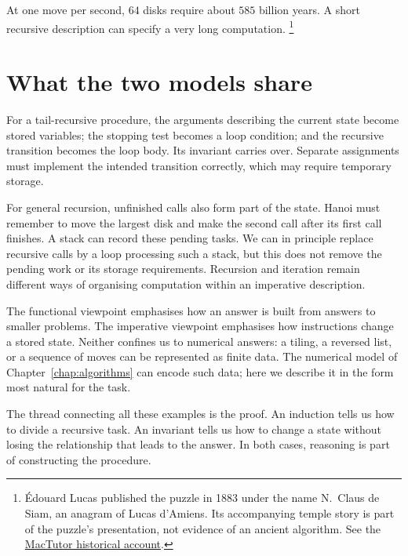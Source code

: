 At one move per second, $64$ disks require about $585$ billion years.
A short recursive description can specify a very long computation.
\footnote{\'Edouard Lucas published the puzzle in 1883 under the name
N.~Claus de Siam, an anagram of Lucas d'Amiens. Its accompanying temple
story is part of the puzzle's presentation, not evidence of an ancient
algorithm. See the \href{https://mathshistory.st-andrews.ac.uk/Extras/Hanoi/}{MacTutor historical account}.}

\section{What the two models share}

For a tail-recursive procedure, the arguments describing the current state
become stored variables; the stopping test becomes a loop condition;
and the recursive transition becomes the loop body. Its invariant carries
over. Separate assignments must implement the intended transition correctly,
which may require temporary storage.

For general recursion, unfinished calls also form part of the state. Hanoi
must remember to move the largest disk and make the second call after its
first call finishes. A stack can record these pending tasks. We can in
principle replace recursive calls by a loop processing such a stack, but
this does not remove the pending work or its storage requirements.
Recursion and iteration remain different ways of organising computation
within an imperative description.

The functional viewpoint emphasises how an answer is built from answers
to smaller problems. The imperative viewpoint emphasises how instructions
change a stored state. Neither confines us to numerical answers: a tiling,
a reversed list, or a sequence of moves can be represented as finite data.
The numerical model of Chapter~\ref{chap:algorithms} can encode such data; here
we describe it in the form most natural for the task.

The thread connecting all these examples is the proof. An induction tells
us how to divide a recursive task. An invariant tells us how to change a
state without losing the relationship that leads to the answer. In both
cases, reasoning is part of constructing the procedure.

